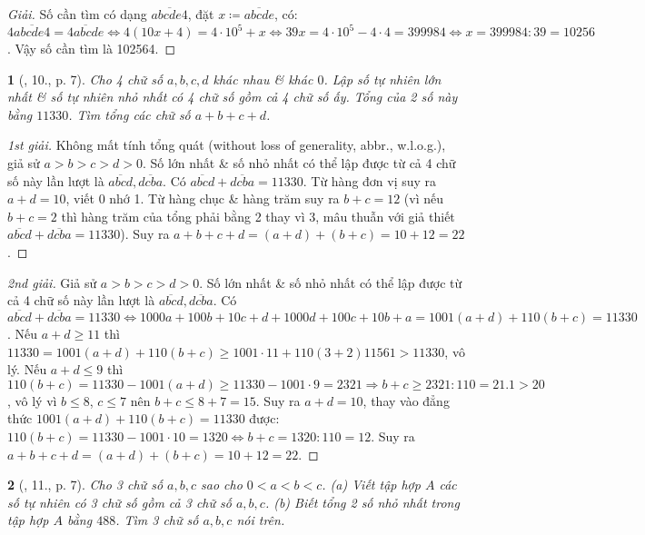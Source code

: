 \documentclass{article}
\newtheorem{baitoan}{}
\begin{document}
\begin{proof}[Giải]
	Số cần tìm có dạng $\overline{abcde4}$, đặt $x\coloneqq\overline{abcde}$, có: $4\overline{abcde4} = \overline{4abcde}\Leftrightarrow4(10x + 4) = 4\cdot10^5 + x\Leftrightarrow39x = 4\cdot10^5 - 4\cdot4 = 399984\Leftrightarrow x = 399984:39 = 10256$. Vậy số cần tìm là 102564.
\end{proof}

\begin{baitoan}[\cite{Binh_Toan_6_tap_1}, 10., p. 7]
	Cho 4 chữ số $a,b,c,d$ khác nhau \& khác $0$. Lập số tự nhiên lớn nhất \& số tự nhiên nhỏ nhất có 4 chữ số gồm cả 4 chữ số ấy. Tổng của 2 số này bằng $11330$. Tìm tổng các chữ số $a + b + c + d$.
\end{baitoan}

\begin{proof}[1st giải]
	Không mất tính tổng quát (without loss of generality, abbr., w.l.o.g.), giả sử $a > b > c > d > 0$. Số lớn nhất \& số nhỏ nhất có thể lập được từ cả 4 chữ số này lần lượt là $\overline{abcd},\overline{dcba}$. Có $\overline{abcd} + \overline{dcba} = 11330$. Từ hàng đơn vị suy ra $a + d = 10$, viết 0 nhớ 1. Từ hàng chục \& hàng trăm suy ra $b + c = 12$ (vì nếu $b + c = 2$ thì hàng trăm của tổng phải bằng 2 thay vì 3, mâu thuẫn với giả thiết $\overline{abcd} + \overline{dcba} = 11330$). Suy ra $a + b + c + d = (a + d) + (b + c) = 10 + 12 = 22$.
\end{proof}

\begin{proof}[2nd giải]
	Giả sử $a > b > c > d > 0$. Số lớn nhất \& số nhỏ nhất có thể lập được từ cả 4 chữ số này lần lượt là $\overline{abcd},\overline{dcba}$. Có $\overline{abcd} + \overline{dcba} = 11330\Leftrightarrow1000a + 100b + 10c + d + 1000d + 100c + 10b + a = 1001(a + d) + 110(b + c) = 11330$. Nếu $a + d\ge11$ thì $11330 = 1001(a + d) + 110(b + c)\ge1001\cdot11 + 110(3 + 2) 11561 > 11330$, vô lý. Nếu $a + d\le9$ thì $110(b + c) = 11330 - 1001(a + d)\ge11330 - 1001\cdot9 = 2321\Rightarrow b + c\ge2321:110 = 21.1 > 20$, vô lý vì $b\le8$, $c\le7$ nên $b + c\le 8 + 7 = 15$. Suy ra $a + d = 10$, thay vào đẳng thức $1001(a + d) + 110(b + c) = 11330$ được: $110(b + c) = 11330 - 1001\cdot10 = 1320\Leftrightarrow b + c = 1320:110 = 12$. Suy ra $a + b + c + d = (a + d) + (b + c) = 10 + 12 = 22$.
\end{proof}

\begin{baitoan}[\cite{Binh_Toan_6_tap_1}, 11., p. 7]
	Cho 3 chữ số $a,b,c$ sao cho $0 < a < b < c$. (a) Viết tập hợp $A$ các số tự nhiên có 3 chữ số gồm cả 3 chữ số $a,b,c$. (b) Biết tổng 2 số nhỏ nhất trong tập hợp $A$ bằng $488$. Tìm 3 chữ số $a,b,c$ nói trên.
\end{baitoan}
\end{document}
